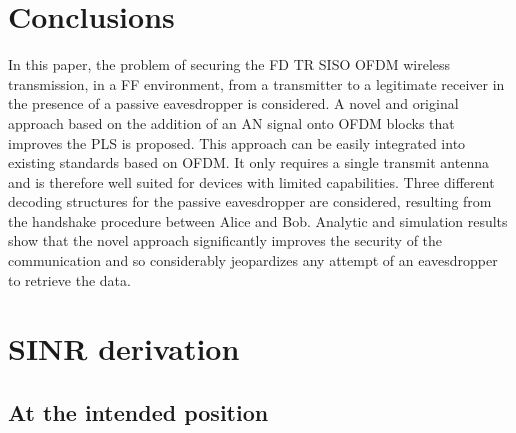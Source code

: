 \documentclass[journal,comsoc]{IEEEtran}
\let\MYoriglatexcaption\caption
\renewcommand{\caption}[2][\relax]{\MYoriglatexcaption[#2]{#2}}
\begin{document}
\section{Conclusions}\label{sec:conclusions}
In this paper, the problem of securing the FD TR SISO OFDM wireless transmission, in a FF environment, from a transmitter to a legitimate receiver in the presence of a passive eavesdropper is considered. A novel and original approach based on the addition of an AN signal onto OFDM blocks that improves the PLS is proposed. This approach can be easily integrated into existing standards based on OFDM. It only requires a single transmit antenna and is therefore well suited for devices with limited capabilities. Three different decoding structures for the passive eavesdropper are considered, resulting from the handshake procedure between Alice and Bob. Analytic and simulation results show that the novel approach significantly improves the security of the communication and so considerably jeopardizes any attempt of an eavesdropper to retrieve the data.















\appendices
\section{SINR derivation}\label{sec:sinr-derivation-app}


\subsection{At the intended position}
\end{document}
